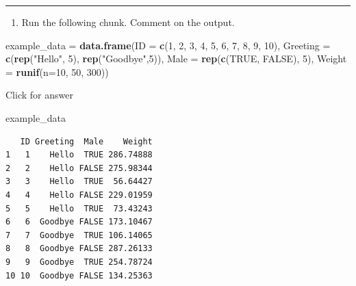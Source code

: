 \documentclass[
]{book}
\newenvironment{Shaded}{\begin{snugshade}}{\end{snugshade}}
\newcommand{\AttributeTok}[1]{\textcolor[rgb]{0.13,0.29,0.53}{#1}}
\newcommand{\ConstantTok}[1]{\textcolor[rgb]{0.56,0.35,0.01}{#1}}
\newcommand{\DecValTok}[1]{\textcolor[rgb]{0.00,0.00,0.81}{#1}}
\newcommand{\FunctionTok}[1]{\textcolor[rgb]{0.13,0.29,0.53}{\textbf{#1}}}
\newcommand{\NormalTok}[1]{#1}
\newcommand{\OtherTok}[1]{\textcolor[rgb]{0.56,0.35,0.01}{#1}}
\newcommand{\StringTok}[1]{\textcolor[rgb]{0.31,0.60,0.02}{#1}}
\providecommand{\tightlist}{%
  \setlength{\itemsep}{0pt}\setlength{\parskip}{0pt}}
\begin{document}
\begin{center}\rule{0.5\linewidth}{0.5pt}\end{center}

\begin{enumerate}
\def\labelenumi{\alph{enumi}.}
\tightlist
\item
  Run the following chunk. Comment on the output.
\end{enumerate}

\begin{Shaded}
\begin{Highlighting}[]
\NormalTok{example\_data }\OtherTok{=} \FunctionTok{data.frame}\NormalTok{(}\AttributeTok{ID =} \FunctionTok{c}\NormalTok{(}\DecValTok{1}\NormalTok{, }\DecValTok{2}\NormalTok{, }\DecValTok{3}\NormalTok{, }\DecValTok{4}\NormalTok{, }\DecValTok{5}\NormalTok{, }\DecValTok{6}\NormalTok{, }\DecValTok{7}\NormalTok{, }\DecValTok{8}\NormalTok{, }\DecValTok{9}\NormalTok{, }\DecValTok{10}\NormalTok{),}
                          \AttributeTok{Greeting =} \FunctionTok{c}\NormalTok{(}\FunctionTok{rep}\NormalTok{(}\StringTok{"Hello"}\NormalTok{, }\DecValTok{5}\NormalTok{), }\FunctionTok{rep}\NormalTok{(}\StringTok{"Goodbye"}\NormalTok{,}\DecValTok{5}\NormalTok{)),}
                          \AttributeTok{Male =} \FunctionTok{rep}\NormalTok{(}\FunctionTok{c}\NormalTok{(}\ConstantTok{TRUE}\NormalTok{, }\ConstantTok{FALSE}\NormalTok{), }\DecValTok{5}\NormalTok{),}
                          \AttributeTok{Weight =} \FunctionTok{runif}\NormalTok{(}\AttributeTok{n=}\DecValTok{10}\NormalTok{, }\DecValTok{50}\NormalTok{, }\DecValTok{300}\NormalTok{))}
\end{Highlighting}
\end{Shaded}

Click for answer

\begin{Shaded}
\begin{Highlighting}[]
\NormalTok{example\_data}
\end{Highlighting}
\end{Shaded}

\begin{verbatim}
   ID Greeting  Male    Weight
1   1    Hello  TRUE 286.74888
2   2    Hello FALSE 275.98344
3   3    Hello  TRUE  56.64427
4   4    Hello FALSE 229.01959
5   5    Hello  TRUE  73.43243
6   6  Goodbye FALSE 173.10467
7   7  Goodbye  TRUE 106.14065
8   8  Goodbye FALSE 287.26133
9   9  Goodbye  TRUE 254.78724
10 10  Goodbye FALSE 134.25363
\end{verbatim}
\end{document}
